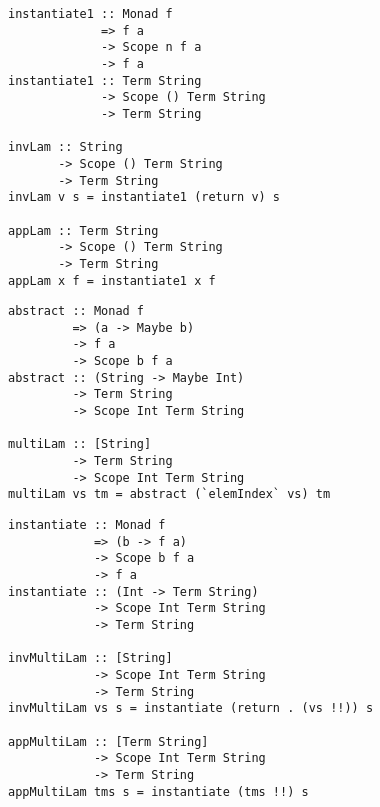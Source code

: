 \documentclass{beamer}
\begin{document}
\begin{frame}[fragile]
  \begin{verbatim}
instantiate1 :: Monad f 
             => f a 
             -> Scope n f a 
             -> f a 
instantiate1 :: Term String 
             -> Scope () Term String 
             -> Term String

invLam :: String 
       -> Scope () Term String 
       -> Term String
invLam v s = instantiate1 (return v) s

appLam :: Term String 
       -> Scope () Term String 
       -> Term String
appLam x f = instantiate1 x f
  \end{verbatim}  
\end{frame}

\begin{frame}[fragile]
  \begin{verbatim}
abstract :: Monad f 
         => (a -> Maybe b) 
         -> f a 
         -> Scope b f a 
abstract :: (String -> Maybe Int) 
         -> Term String 
         -> Scope Int Term String

multiLam :: [String] 
         -> Term String 
         -> Scope Int Term String
multiLam vs tm = abstract (`elemIndex` vs) tm
  \end{verbatim}  
\end{frame}

\begin{frame}[fragile]
  \begin{verbatim}
instantiate :: Monad f 
            => (b -> f a) 
            -> Scope b f a 
            -> f a
instantiate :: (Int -> Term String) 
            -> Scope Int Term String 
            -> Term String

invMultiLam :: [String] 
            -> Scope Int Term String 
            -> Term String
invMultiLam vs s = instantiate (return . (vs !!)) s

appMultiLam :: [Term String] 
            -> Scope Int Term String 
            -> Term String
appMultiLam tms s = instantiate (tms !!) s
  \end{verbatim}  
\end{frame}
\end{document}
